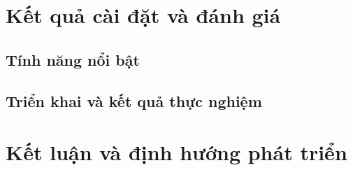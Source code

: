 \documentclass{report}
\begin{document}
\chapter{Kết quả cài đặt và đánh giá}

\section{Tính năng nổi bật}


% 

% 

\section{Triển khai và kết quả thực nghiệm}


\chapter{Kết luận và định hướng phát triển}


\nocite{*}
\printbibliography[heading=bibintoc, title=Tài liệu tham khảo]



\end{document}
